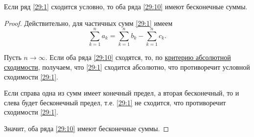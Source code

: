 \documentclass[../../main.tex]{subfiles}
\begin{document}
	\begin{thm}\label{29:conditional_conv}
		Если ряд \eqref{29:1} сходится условно, то оба ряда \eqref{29:10} имеют бесконечные суммы.
	\end{thm}
	\begin{proof}
		Действительно, для частичных сумм \eqref{29:1} имеем 
		\[\sum_{k = 1}^n a_k = \sum_{k = 1}^n b_k - \sum_{k = 1}^n c_k.\]
		
		Пусть $n\to\infty$. Если оба ряда \eqref{29:10} сходятся, то, по \href{29:absolute_conv}{критерию абсолютной сходимости}, получаем, что \eqref{29:1} сходится абсолютно, что противоречит условной сходимости \eqref{29:1}.
		
		Если справа одна из сумм имеет конечный предел, а вторая бесконечный, то и слева будет бесконечный предел, т.е. \eqref{29:1} не сходится, что противоречит сходимости \eqref{29:1}.
		
		Значит, оба ряда \eqref{29:10} имеют бесконечные суммы.
	\end{proof}
\end{document}

